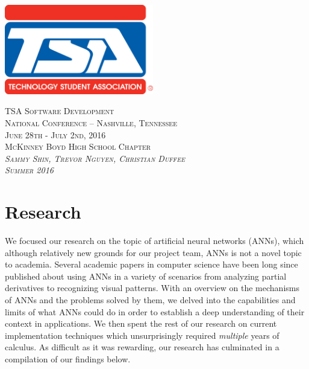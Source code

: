 \documentclass[letterpaper, 10pt]{article}
\begin{document}
\begin{titlepage}
	\centering	
	\includegraphics[width=6.50cm]{res/TSA-Emblem.png}
	\vspace{1.15cm}
	
	\scshape\Huge TSA Software Development \\
	\vspace{0.25cm}
	\scshape\LARGE National Conference -- Nashville, Tennessee \\
	\vspace{0.25cm}
	\scshape\LARGE June 28th - July 2nd, 2016 \\
	
	\vspace{1.55cm}
%	
	\mdseries\Large McKinney Boyd High School Chapter \\
	\vspace{0.25cm}
	\slshape\LARGE Sammy Shin, Trevor Nguyen, Christian Duffee \\
	\vspace{0.25cm}
	\scshape\LARGE Summer 2016 \\
\end{titlepage}

\cleardoublepage

\Large
\tableofcontents
\normalsize

\cleardoublepage

\section{Research}
	We focused our research on the topic of artificial neural networks (ANNs), which although relatively new grounds for our project team, ANNs is not a novel topic to academia. Several academic papers in computer science have been long since published about using ANNs in a variety of scenarios from analyzing partial derivatives to recognizing visual patterns. With an overview on the mechanisms of ANNs and the problems solved by them, we delved into the capabilities and limits of what ANNs could do in order to establish a deep understanding of their context in applications. We then spent the rest of our research on current implementation techniques which unsurprisingly required \emph{multiple} years of calculus. As difficult as it was rewarding, our research has culminated in a compilation of our findings below.
\end{document}
